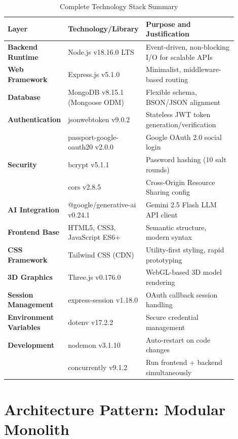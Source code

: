 \documentclass[12pt, a4paper]{report}
\begin{document}
\begin{table}[H]
\centering
\caption{Complete Technology Stack Summary}
\label{tab:tech_stack_summary}
\small
\begin{tabular}{@{}p{0.20\linewidth}p{0.30\linewidth}p{0.40\linewidth}@{}}
\toprule
\textbf{Layer} & \textbf{Technology/Library} & \textbf{Purpose and Justification} \\
\midrule
\textbf{Backend Runtime} & Node.js v18.16.0 LTS & Event-driven, non-blocking I/O for scalable APIs \\
\textbf{Web Framework} & Express.js v5.1.0 & Minimalist, middleware-based routing \\
\textbf{Database} & MongoDB v8.15.1 (Mongoose ODM) & Flexible schema, BSON/JSON alignment \\
\textbf{Authentication} & jsonwebtoken v9.0.2 & Stateless JWT token generation/verification \\
 & passport-google-oauth20 v2.0.0 & Google OAuth 2.0 social login \\
\textbf{Security} & bcrypt v5.1.1 & Password hashing (10 salt rounds) \\
 & cors v2.8.5 & Cross-Origin Resource Sharing config \\
\textbf{AI Integration} & @google/generative-ai v0.24.1 & Gemini 2.5 Flash LLM API client \\
\textbf{Frontend Base} & HTML5, CSS3, JavaScript ES6+ & Semantic structure, modern syntax \\
\textbf{CSS Framework} & Tailwind CSS (CDN) & Utility-first styling, rapid prototyping \\
\textbf{3D Graphics} & Three.js v0.176.0 & WebGL-based 3D model rendering \\
\textbf{Session Management} & express-session v1.18.0 & OAuth callback session handling \\
\textbf{Environment Variables} & dotenv v17.2.2 & Secure credential management \\
\textbf{Development} & nodemon v3.1.10 & Auto-restart on code changes \\
 & concurrently v9.1.2 & Run frontend + backend simultaneously \\
\bottomrule
\end{tabular}
\end{table}

\section{Architecture Pattern: Modular Monolith}
\end{document}
